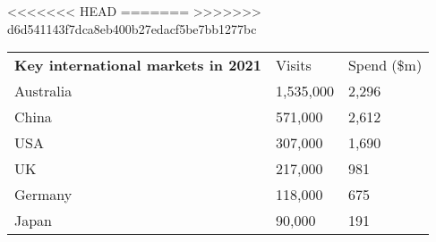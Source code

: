 <<<<<<< HEAD
=======
>>>>>>> d6d541143f7dca8eb400b27edacf5be7bb1277bc
\begin{tabular}[t]{p{4.7cm}>{\hfill}p{1.1cm}>{\hfill}p{1.7cm}}
 \textbf{Key international markets in 2021} & Visits & Spend (\$m) \\ 
 Australia & 1,535,000 & 2,296 \\ 
  China &   571,000 & 2,612 \\ 
  USA &   307,000 & 1,690 \\ 
  UK &   217,000 & 981 \\ 
  Germany &   118,000 & 675 \\ 
  Japan &    90,000 & 191 \\ 
  \end{tabular}
